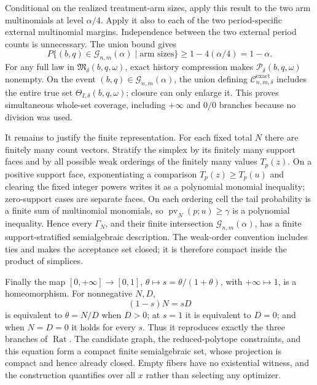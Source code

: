 Conditional on the realized treatment-arm sizes, apply this result to the two arm multinomials at level \(\alpha/4\).  Apply it also to each of the two period-specific external multinomial margins.  Independence between the two external period counts is unnecessary.  The union bound gives
\[
P\{(b,q)\in\mathcal G_{n,m}(\alpha)\mid\text{arm sizes}\}\geq1-4(\alpha/4)=1-\alpha.
\]
For any full law in \(\mathfrak M_\delta(b,q,\omega)\), exact history compression makes \(\mathcal P_\delta(b,q,\omega)\) nonempty.  On the event \((b,q)\in\mathcal G_{n,m}(\alpha)\), the union defining \(\mathcal C_{n,m,\delta}^{\mathrm{exact}}\) includes the entire true set \(\Theta_{I,\delta}(b,q,\omega)\); closure can only enlarge it.  This proves simultaneous whole-set coverage, including \(+\infty\) and \(0/0\) branches because no division was used.

It remains to justify the finite representation.  For each fixed total \(N\) there are finitely many count vectors.  Stratify the simplex by its finitely many support faces and by all possible weak orderings of the finitely many values \(T_p(z)\).  On a positive support face, exponentiating a comparison \(T_p(z)\geq T_p(u)\) and clearing the fixed integer powers writes it as a polynomial monomial inequality; zero-support cases are separate faces.  On each ordering cell the tail probability is a finite sum of multinomial monomials, so \(\operatorname{pv}_N(p;u)\geq\gamma\) is a polynomial inequality.  Hence every \(\Gamma_N\), and their finite intersection \(\mathcal G_{n,m}(\alpha)\), has a finite support-stratified semialgebraic description.  The weak-order convention includes ties and makes the acceptance set closed; it is therefore compact inside the product of simplices.

Finally the map \([0,+\infty]\to[0,1]\), \(\theta\mapsto s=\theta/(1+\theta)\), with \(+\infty\mapsto1\), is a homeomorphism.  For nonnegative \(N,D\),
\[
(1-s)N=sD
\]
is equivalent to \(\theta=N/D\) when \(D>0\); at \(s=1\) it is equivalent to \(D=0\); and when \(N=D=0\) it holds for every \(s\).  Thus it reproduces exactly the three branches of \(\operatorname{Rat}\).  The candidate graph, the reduced-polytope constraints, and this equation form a compact finite semialgebraic set, whose projection is compact and hence already closed.  Empty fibers have no existential witness, and the construction quantifies over all \(x\) rather than selecting any optimizer.
